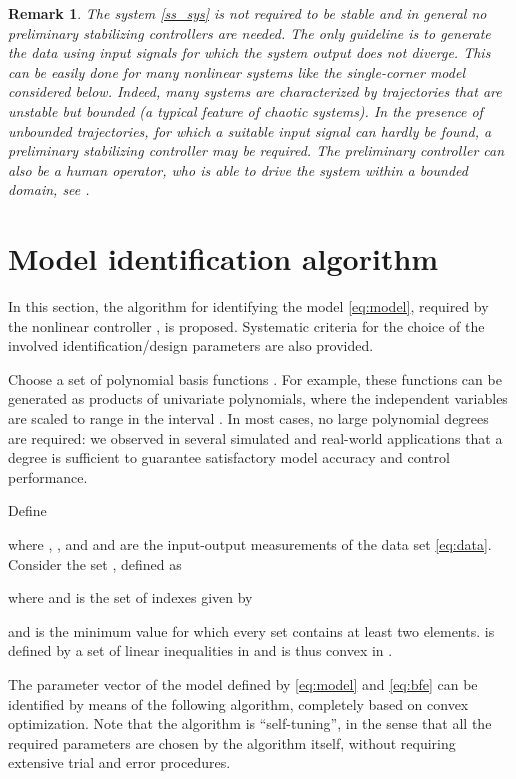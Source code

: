 \documentclass[twocolumn,english,journal]{IEEEtran}
\newtheorem{remark}{Remark}
\begin{document}
\begin{remark}The system \eqref{ss_sys} is not required to be stable
and in general no preliminary stabilizing controllers are needed.
The only guideline is to generate the data using input signals for
which the system output does not diverge. This can be easily done
for many nonlinear systems like the single-corner model considered
below. Indeed, many systems are characterized by trajectories that
are unstable but bounded (a typical feature of chaotic systems). In
the presence of unbounded trajectories, for which a suitable input
signal can hardly be found, a preliminary stabilizing controller may
be required. The preliminary controller can also be a human operator,
who is able to drive the system within a bounded domain, see \cite{NoFaMiAUT13,movie_dfk}.\end{remark}


\section{Model identification algorithm}

\label{sec:design}

In this section, the algorithm for identifying the model \eqref{eq:model},
required by the nonlinear controller , is proposed. Systematic
criteria for the choice of the involved identification/design parameters
are also provided.

Choose a set of polynomial basis functions . For example,
these functions can be generated as products of univariate polynomials,
where the independent variables are scaled to range in the interval
. In most cases, no large polynomial degrees are required:
we observed in several simulated and real-world applications that
a degree  is sufficient to guarantee satisfactory model
accuracy and control performance.

Define 

where , , and 
and  are the input-output measurements of the data
set \eqref{eq:data}. Consider the set ,
defined as

where  and 
is the set of indexes given by 

and  is the minimum value for which every set 
contains at least two elements.  is defined by a set of linear
inequalities in  and is thus convex in .

The parameter vector 
of the model defined by \eqref{eq:model} and \eqref{eq:bfe} can
be identified by means of the following algorithm, completely based
on convex optimization. Note that the algorithm is ``self-tuning'',
in the sense that all the required parameters are chosen by the algorithm
itself, without requiring extensive trial and error procedures.\medskip{}
\end{document}

